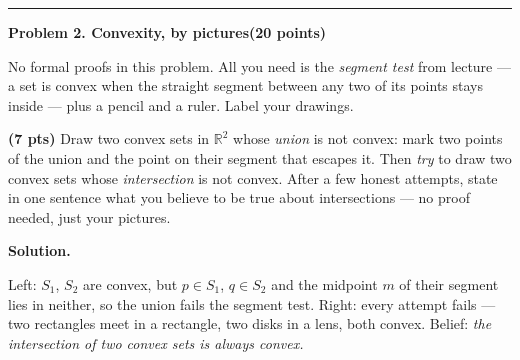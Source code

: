 \documentclass[10pt]{article}
\newcommand{\problem}[2]{%
  \par\bigskip
  {\color{ruleink}\rule{\textwidth}{1pt}}\par\nobreak\vspace{3pt}
  {\large\bfseries #2}\hfill{\normalsize\bfseries(#1 points)}\par\nobreak\vspace{4pt}}
\newenvironment{solution}
  {\par\smallskip\begingroup\color{solink}\textbf{Solution.}\ }
  {\endgroup\par}
\begin{document}
\problem{20}{Problem 2. Convexity, by pictures}

No formal proofs in this problem. All you need is the \emph{segment test} from
lecture --- a set is convex when the straight segment between any two of its points
stays inside --- plus a pencil and a ruler. Label your drawings.

\begin{parts}
\item \textbf{(7 pts)} Draw two convex sets in $\mathbb{R}^2$ whose \emph{union} is
  not convex: mark two points of the union and the point on their segment that
  escapes it. Then \emph{try} to draw two convex sets whose \emph{intersection} is
  not convex. After a few honest attempts, state in one sentence what you believe
  to be true about intersections --- no proof needed, just your pictures.

\begin{solution}
\par\medskip
\begin{center}
\end{center}
Left: $S_1$, $S_2$ are convex, but $p \in S_1$, $q \in S_2$ and the midpoint $m$
of their segment lies in neither, so the union fails the segment test.
Right: every attempt fails --- two rectangles meet in a rectangle, two disks in a
lens, both convex. Belief: \emph{the intersection of two convex sets is always convex.}
\end{solution}


\end{parts}
\end{document}
